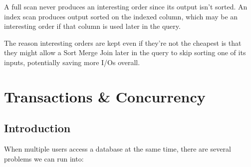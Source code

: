 \documentclass{article}
\begin{document}
A full scan never produces an interesting order since its output isn't sorted. An index scan produces output sorted on the indexed column, which may be an interesting order if that column is used later in the query.

The reason interesting orders are kept even if they're not the cheapest is that they might allow a Sort Merge Join later in the query to skip sorting one of its inputs, potentially saving more I/Os overall.

\section{Transactions \& Concurrency}

\subsection{Introduction}

When multiple users access a database at the same time, there are several problems we can run into:
\end{document}
